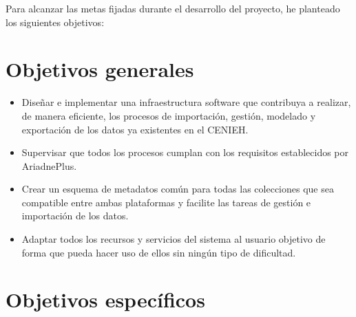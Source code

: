 
Para alcanzar las metas fijadas durante el desarrollo del proyecto, he planteado los siguientes objetivos:

\section{Objetivos generales}\label{obj.gen}

\begin{itemize}
\tightlist
\item
Diseñar e implementar una infraestructura software que contribuya a realizar, de manera eficiente, los procesos de importación, gestión, modelado y exportación de los datos ya existentes en el CENIEH. 
\item
Supervisar que todos los procesos cumplan con los requisitos establecidos por AriadnePlus.
\item
Crear un esquema de metadatos común para todas las colecciones que sea compatible entre ambas plataformas y facilite las tareas de gestión e importación de los datos.
\item
Adaptar todos los recursos y servicios del sistema al usuario objetivo de forma que pueda hacer uso de ellos sin ningún tipo de dificultad.
\end{itemize}

\section{Objetivos específicos}\label{obj.esp}

